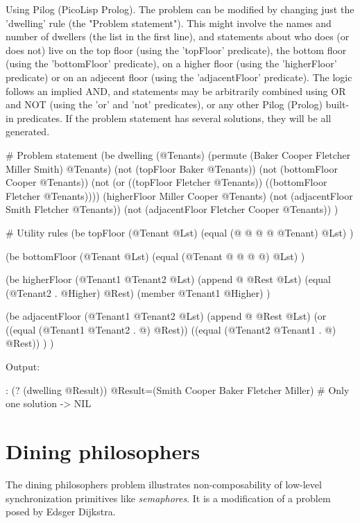 \begin{wideverbatim}

Using Pilog (PicoLisp Prolog). The problem can be modified by changing just the
'dwelling' rule (the "Problem statement"). This might involve the names and
number of dwellers (the list in the first line), and statements about who does
(or does not) live on the top floor (using the 'topFloor' predicate), the bottom
floor (using the 'bottomFloor' predicate), on a higher floor (using the
'higherFloor' predicate) or on an adjecent floor (using the 'adjacentFloor'
predicate). The logic follows an implied AND, and statements may be arbitrarily
combined using OR and NOT (using the 'or' and 'not' predicates), or any other
Pilog (Prolog) built-in predicates. If the problem statement has several
solutions, they will be all generated.

# Problem statement
(be dwelling (@Tenants)
   (permute (Baker Cooper Fletcher Miller Smith) @Tenants)
   (not (topFloor Baker @Tenants))
   (not (bottomFloor Cooper @Tenants))
   (not (or ((topFloor Fletcher @Tenants)) ((bottomFloor Fletcher @Tenants))))
   (higherFloor Miller Cooper @Tenants)
   (not (adjacentFloor Smith Fletcher @Tenants))
   (not (adjacentFloor Fletcher Cooper @Tenants)) )

# Utility rules
(be topFloor (@Tenant @Lst)
   (equal (@ @ @ @ @Tenant) @Lst) )

(be bottomFloor (@Tenant @Lst)
   (equal (@Tenant @ @ @ @) @Lst) )

(be higherFloor (@Tenant1 @Tenant2 @Lst)
   (append @ @Rest @Lst)
   (equal (@Tenant2 . @Higher) @Rest)
   (member @Tenant1 @Higher) )

(be adjacentFloor (@Tenant1 @Tenant2 @Lst)
   (append @ @Rest @Lst)
   (or
      ((equal (@Tenant1 @Tenant2 . @) @Rest))
      ((equal (@Tenant2 @Tenant1 . @) @Rest)) ) )

Output:

: (? (dwelling @Result))
 @Result=(Smith Cooper Baker Fletcher Miller)  # Only one solution
-> NIL

\end{wideverbatim}

\pagebreak{}
\section*{Dining philosophers}

The dining philosophers problem illustrates non-composability of
low-level synchronization primitives like
\emph{semaphores}. It is a modification of a problem
posed by Edsger Dijkstra.

